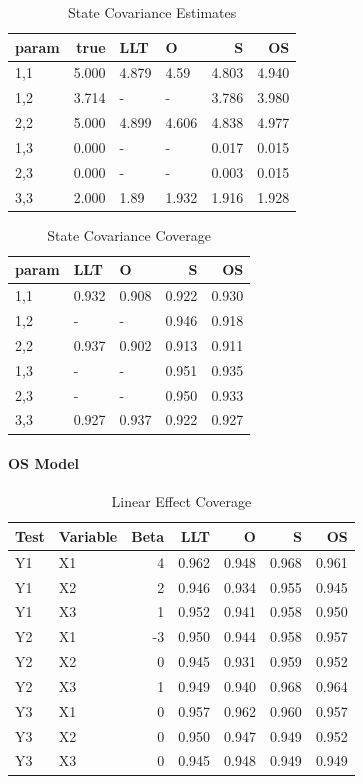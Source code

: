 \documentclass[
]{article}
\begin{document}
\begin{longtable}[t]{l|r|l|l|r|r}
\caption{\label{tab:unnamed-chunk-18}State Covariance Estimates}\\
\hline
param & true & LLT & O & S & OS\\
\hline
1,1 & 5.000 & 4.879 & 4.59 & 4.803 & 4.940\\
\hline
1,2 & 3.714 & - & - & 3.786 & 3.980\\
\hline
2,2 & 5.000 & 4.899 & 4.606 & 4.838 & 4.977\\
\hline
1,3 & 0.000 & - & - & 0.017 & 0.015\\
\hline
2,3 & 0.000 & - & - & 0.003 & 0.015\\
\hline
3,3 & 2.000 & 1.89 & 1.932 & 1.916 & 1.928\\
\hline
\end{longtable}

\begin{longtable}[t]{l|l|l|r|r}
\caption{\label{tab:unnamed-chunk-19}State Covariance Coverage}\\
\hline
param & LLT & O & S & OS\\
\hline
1,1 & 0.932 & 0.908 & 0.922 & 0.930\\
\hline
1,2 & - & - & 0.946 & 0.918\\
\hline
2,2 & 0.937 & 0.902 & 0.913 & 0.911\\
\hline
1,3 & - & - & 0.951 & 0.935\\
\hline
2,3 & - & - & 0.950 & 0.933\\
\hline
3,3 & 0.927 & 0.937 & 0.922 & 0.927\\
\hline
\end{longtable}

\hypertarget{os-model-1}{%
\paragraph{OS Model}\label{os-model-1}}

\begin{longtable}[t]{l|l|r|r|r|r|r}
\caption{\label{tab:unnamed-chunk-20}Linear Effect Coverage}\\
\hline
Test & Variable & Beta & LLT & O & S & OS\\
\hline
Y1 & X1 & 4 & 0.962 & 0.948 & 0.968 & 0.961\\
\hline
Y1 & X2 & 2 & 0.946 & 0.934 & 0.955 & 0.945\\
\hline
Y1 & X3 & 1 & 0.952 & 0.941 & 0.958 & 0.950\\
\hline
Y2 & X1 & -3 & 0.950 & 0.944 & 0.958 & 0.957\\
\hline
Y2 & X2 & 0 & 0.945 & 0.931 & 0.959 & 0.952\\
\hline
Y2 & X3 & 1 & 0.949 & 0.940 & 0.968 & 0.964\\
\hline
Y3 & X1 & 0 & 0.957 & 0.962 & 0.960 & 0.957\\
\hline
Y3 & X2 & 0 & 0.950 & 0.947 & 0.949 & 0.952\\
\hline
Y3 & X3 & 0 & 0.945 & 0.948 & 0.949 & 0.949\\
\hline
\end{longtable}
\end{document}
